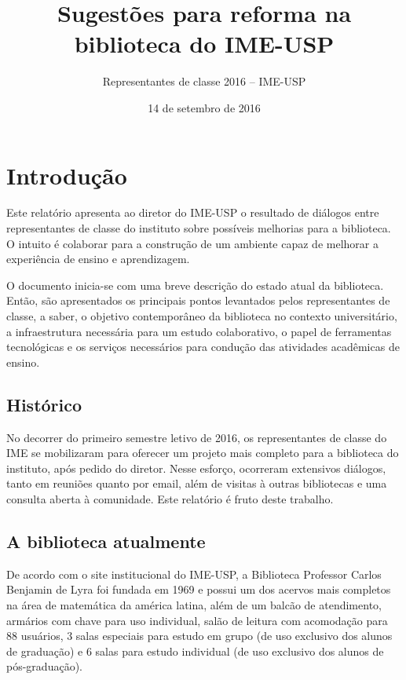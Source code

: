 \documentclass[titlepage]{article}
\title{Sugestões para reforma na biblioteca do IME-USP}
\author{Representantes de classe 2016 -- IME-USP}
\date{14 de setembro de 2016}
\begin{document}
\maketitle
\tableofcontents

\clearpage
\section{Introdução}
Este relatório apresenta ao diretor do IME-USP o resultado de diálogos entre 
representantes de classe do instituto sobre possíveis melhorias para a 
biblioteca. O intuito é colaborar para a construção de um ambiente capaz de
melhorar a experiência de ensino e aprendizagem.

O documento inicia-se com uma breve descrição do estado atual da biblioteca. 
Então, são apresentados os principais pontos levantados pelos representantes 
de classe, a saber, o objetivo contemporâneo da biblioteca no contexto 
universitário, a infraestrutura necessária para um estudo colaborativo, o 
papel de ferramentas tecnológicas e os serviços necessários para condução 
das atividades acadêmicas de ensino.

\subsection{Histórico}
No decorrer do primeiro semestre letivo de 2016, os representantes de classe
do IME se mobilizaram para oferecer um projeto mais completo para a biblioteca 
do instituto, após pedido do diretor. Nesse esforço, ocorreram extensivos 
diálogos, tanto em reuniões quanto por email, além de visitas à outras 
bibliotecas e uma consulta aberta à comunidade. Este relatório é fruto deste
trabalho.

\subsection{A biblioteca atualmente}
De acordo com o site institucional do IME-USP, a Biblioteca Professor Carlos
Benjamin de Lyra foi fundada em 1969 e possui um dos acervos mais completos na 
área de matemática da américa latina, além de um balcão de atendimento, armários
com chave para uso individual, salão de leitura com acomodação para 88 usuários,
3 salas especiais para estudo em grupo (de uso exclusivo dos alunos de 
graduação) e 6 salas para estudo individual (de uso exclusivo dos alunos de 
pós-graduação).
\end{document}
